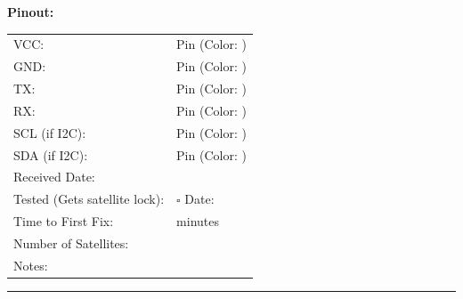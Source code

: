 \documentclass[10pt,letterpaper]{article}
\begin{document}
\textbf{Pinout:}
\begin{tabularx}{\textwidth}{lX}
VCC: & Pin \underline{\hspace{1cm}} (Color: \underline{\hspace{2cm}}) \\
GND: & Pin \underline{\hspace{1cm}} (Color: \underline{\hspace{2cm}}) \\
TX: & Pin \underline{\hspace{1cm}} (Color: \underline{\hspace{2cm}}) \\
RX: & Pin \underline{\hspace{1cm}} (Color: \underline{\hspace{2cm}}) \\
SCL (if I2C): & Pin \underline{\hspace{1cm}} (Color: \underline{\hspace{2cm}}) \\
SDA (if I2C): & Pin \underline{\hspace{1cm}} (Color: \underline{\hspace{2cm}}) \\[0.5em]
Received Date: & \underline{\hspace{4cm}} \\
Tested (Gets satellite lock): & $\square$ \quad Date: \underline{\hspace{3cm}} \\
Time to First Fix: & \underline{\hspace{3cm}} minutes \\
Number of Satellites: & \underline{\hspace{4cm}} \\
Notes: & \underline{\hspace{10cm}} \\
\end{tabularx}

\vspace{0.5em}
\hrule
\vspace{0.5em}
\end{document}
